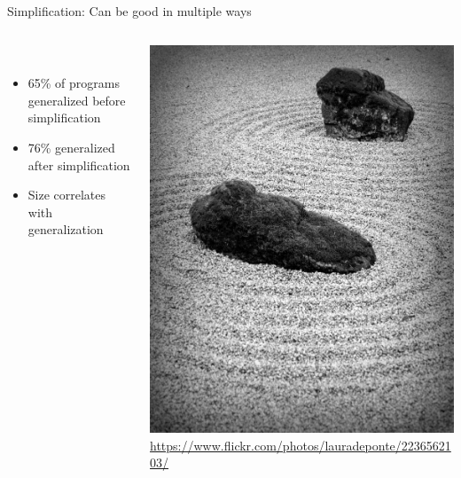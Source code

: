 \documentclass{beamer}
\begin{document}
\begin{frame}{Simplification: Can be good in multiple ways}
\begin{columns}
\begin{column}{0.6\textwidth}
\begin{overprint}
~

\begin{itemize}
	\item 65\% of programs generalized before simplification 
	\item 76\% generalized after simplification
	\item Size correlates with generalization
\end{itemize}

\end{overprint}

\end{column}
\begin{column}{0.4\textwidth}
	\begin{overprint}
		\begin{center}
		\includegraphics[height=0.7\textheight]{Illustrations/zen.jpg} \\
		\tiny \url{https://www.flickr.com/photos/lauradeponte/2236562103/}
		\end{center} 
		\begin{center}

\end{center}
\end{overprint}
\end{column}
\end{columns}
\end{frame}
\end{document}
